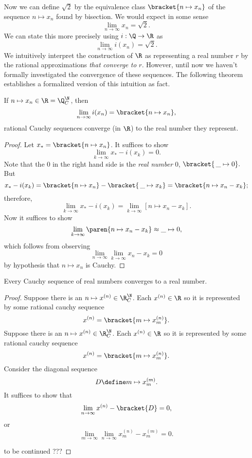 \documentclass{scrartcl}
\begin{document}
Now we can define \(\sqrt 2\) by the equivalence class \(\bracket{n\mapsto x_{n}}\) of the sequence \(n\mapsto x_{n}\) found by bisection. We would expect in some sense
\[
  \lim_{{n\to\infty}}x_{n} = \sqrt 2.
\]
We can state this more precisely using \(i:\Q\to\R\) as
\[
  \lim_{n\to\infty}i(x_{n}) = \sqrt 2.
\]
We intuitively interpret the construction of \(\R\) as representing a real number \(r\) by the rational approximations \emph{that converge to \(r\)}. However, until now we haven't formally investigated the convergence of these sequences. The following theorem establishes a formalized version of this intuition as fact.
\begin{theorem}
  If \(n\mapsto x_{n} \in \R=\Q^{\N}_{C}\), then
  \[
    \lim_{n\to\infty} i(x_{n}) = \bracket{n\mapsto x_{n}},
  \]
  \ie{} rational Cauchy sequences converge (in \(\R\)) to the real number they represent.
\end{theorem}
\begin{proof}
  Let \(x_{*}=\bracket{n\mapsto x_{n}}\). It suffices to show
  \[
    \lim_{k\to\infty} x_{*}-i(x_{k}) = 0.
  \]
  Note that the \(0\) in the right hand side is the \emph{real number} \(0\), \ie{}
  \(
    \bracket{\,\_{}\mapsto 0}.
  \)
  But
  \[
    x_{*} - i(x_{k}) = \bracket{n \mapsto x_{n}}-\bracket{\,\_{}\mapsto x_{k}} = \bracket{n\mapsto x_{n}-x_{k}};
  \]
  therefore,
  \[
    \lim_{{k\to\infty}} x_{*}-i(x_{k}) = \lim_{k\to\infty} [n\mapsto x_{n}-x_{k}].
  \]
  Now it suffices to show
  \[
    \lim_{k\to\infty}\paren{n\mapsto x_{n} -x_{k}} \approx \_{}\mapsto0,
  \]
  which follows from observing
  \[
    \lim_{n\to\infty}\lim_{k\to\infty} x_{n}-x_{k} =0
  \]
  by hypothesis that \(n\mapsto x_{n}\) is Cauchy.
\end{proof}
\begin{theorem}
  Every Cauchy sequence of real numbers converges to a real number.
\end{theorem}
\begin{proof}
  Suppose there is an \(n\mapsto x^{(n)}\in \R^{\N}_{C}\). Each \(x^{(n)}\in \R\) so it is represented by some rational cauchy sequence
  \[
    x^{(n)} = \bracket{m\mapsto x^{(n)}_{m}}.
  \]
  Suppose there is an \(n\mapsto x^{(n)}\in \R^{\N}_{C}\). Each \(x^{(n)}\in \R\) so it is represented by some rational cauchy sequence
  \[
    x^{(n)} = \bracket{m\mapsto x^{(n)}_{m}}.
  \]
  Consider the diagonal sequence
  \[
    D\define m\mapsto x^{(m)}_{m}.
  \]
  It suffices to show that
  \[
    \lim_{n\to\infty}x^{(n)} - \bracket{D} = 0,
  \]
  or
  \[
    \lim_{m\to\infty}\lim_{n\to\infty} x^{(n)}_{m}-x^{(m)}_{m} = 0.
  \]


 to be continued ???

\end{proof}
\end{document}
